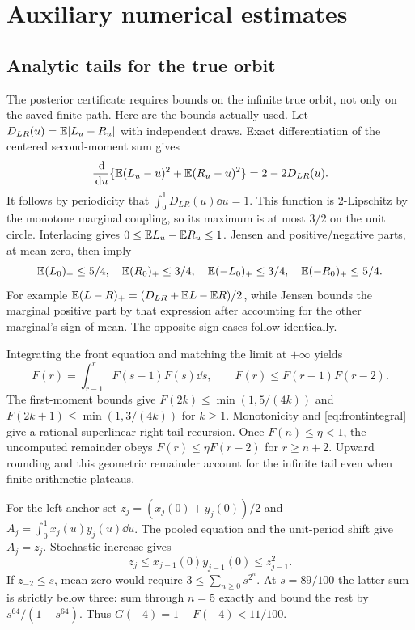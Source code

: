 \section{Auxiliary numerical estimates}
\subsection{Analytic tails for the true orbit}\label{app:tails}
The posterior certificate requires bounds on the infinite true orbit, not only on the saved finite path. Here are the bounds actually used. Let $D_{LR}(u)=\mathbb E|L_u-R_u|$ with independent draws. Exact differentiation of the centered second-moment sum gives
\[
 \frac{\,\mathrm d}{\,\mathrm d u}\{\mathbb E(L_u-u)^2+\mathbb E(R_u-u)^2\}=2-2D_{LR}(u).
\]
It follows by periodicity that $\int_0^1D_{LR}(u)\dd u=1$. This function is $2$-Lipschitz by the monotone marginal coupling, so its maximum is at most $3/2$ on the unit circle. Interlacing gives $0\le\mathbb E L_u-\mathbb E R_u\le1$. Jensen and positive/negative parts, at mean zero, then imply
\[
 \mathbb E(L_0)_+\le5/4,\quad \mathbb E(R_0)_+\le3/4,\quad
 \mathbb E(-L_0)_+\le3/4,\quad \mathbb E(-R_0)_+\le5/4.
\]
For example $\mathbb E(L-R)_+=(D_{LR}+\mathbb E L-\mathbb E R)/2$, while Jensen bounds the marginal positive part by that expression after accounting for the other marginal's sign of mean. The opposite-sign cases follow identically.

Integrating the front equation and matching the limit at $+\infty$ yields
\begin{equation}\label{eq:frontintegral}
 F(r)=\int_{r-1}^rF(s-1)F(s)\dd s,
 \qquad F(r)\le F(r-1)F(r-2).
\end{equation}
The first-moment bounds give $F(2k)\le\min(1,5/(4k))$ and $F(2k+1)\le\min(1,3/(4k))$ for $k\ge1$. Monotonicity and \eqref{eq:frontintegral} give a rational superlinear right-tail recursion. Once $F(n)\le\eta<1$, the uncomputed remainder obeys $F(r)\le\eta F(r-2)$ for $r\ge n+2$. Upward rounding and this geometric remainder account for the infinite tail even when finite arithmetic plateaus.

For the left anchor set $z_j=(x_j(0)+y_j(0))/2$ and $A_j=\int_0^1x_j(u)y_j(u)\dd u$. The pooled equation and the unit-period shift give $A_j=z_j$. Stochastic increase gives
\[
 z_j\le x_{j-1}(0)y_{j-1}(0)\le z_{j-1}^2.
\]
If $z_{-2}\le s$, mean zero would require $3\le\sum_{n\ge0}s^{2^n}$. At $s=89/100$ the latter sum is strictly below three: sum through $n=5$ exactly and bound the rest by $s^{64}/(1-s^{64})$. Thus $G(-4)=1-F(-4)<11/100$.


